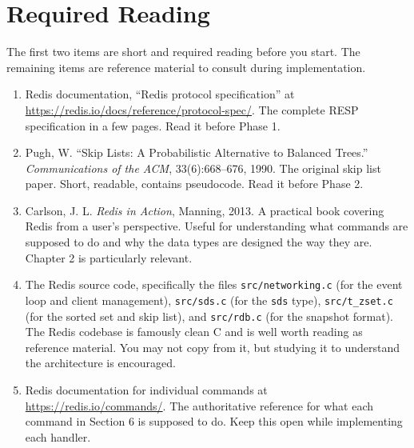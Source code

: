 \documentclass[11pt,a4paper]{article}
\begin{document}
\section{Required Reading}

The first two items are short and required reading before you start. The remaining items are reference material to consult during implementation.

\begin{enumerate}
\item Redis documentation, ``Redis protocol specification'' at \url{https://redis.io/docs/reference/protocol-spec/}. The complete RESP specification in a few pages. Read it before Phase 1.

\item Pugh, W. ``Skip Lists: A Probabilistic Alternative to Balanced Trees.'' \textit{Communications of the ACM}, 33(6):668--676, 1990. The original skip list paper. Short, readable, contains pseudocode. Read it before Phase 2.

\item Carlson, J. L. \textit{Redis in Action}, Manning, 2013. A practical book covering Redis from a user's perspective. Useful for understanding what commands are supposed to do and why the data types are designed the way they are. Chapter 2 is particularly relevant.

\item The Redis source code, specifically the files \texttt{src/networking.c} (for the event loop and client management), \texttt{src/sds.c} (for the \texttt{sds} type), \texttt{src/t\_zset.c} (for the sorted set and skip list), and \texttt{src/rdb.c} (for the snapshot format). The Redis codebase is famously clean C and is well worth reading as reference material. You may not copy from it, but studying it to understand the architecture is encouraged.

\item Redis documentation for individual commands at \url{https://redis.io/commands/}. The authoritative reference for what each command in Section 6 is supposed to do. Keep this open while implementing each handler.
\end{enumerate}

\footerboxes
\end{document}
